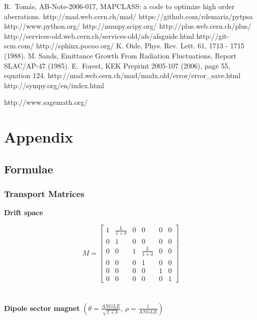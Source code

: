 \documentclass[a4paper]{cernatsnote}
\begin{document}
\begin{thebibliography}{9}   %

 R.~Tom\'as, AB-Note-2006-017, MAPCLASS: a code to
  optimize high order aberrations.
%
 http://mad.web.cern.ch/mad/
%
 https://github.com/rdemaria/pytpsa
%
 http://www.python.org/
%
 http://numpy.scipy.org/
%
 http://plus.web.cern.ch/plus/
%
  http://services-old.web.cern.ch/services-old/afs/afsguide.html
%
 http://git-scm.com/
%
 http://sphinx.pocoo.org/
%
 K. Oide, Phys. Rev. Lett. 61, 1713 - 1715 (1988).
%
 M. Sands, Emittance Growth From Radiation
  Fluctuations, Report SLAC/AP-47 (1985).
%
 E.~Forest, KEK Preprint 2005-107 (2006), page 55,
  equation 124.
%
 http://mad.web.cern.ch/mad/madx.old/error/error\_save.html
%
  http://sympy.org/en/index.html

  http://www.sagemath.org/

\end{thebibliography}

\clearpage
\appendix
\section{Appendix}

\subsection{Formulae}
\subsubsection{Transport Matrices}
\label{ap:trans1}
\textbf{Drift space}

\[
M
=
\begin{bmatrix}
1 & \frac{L}{1+\delta} & 0 & 0 & 0 & 0 \\[0.3em]
0 & 1 & 0 & 0 & 0 & 0 \\[0.3em]
0 & 0 & 1 & \frac{L}{1+\delta} & 0 & 0 \\[0.3em]
0 & 0 & 0 & 1 & 0 & 0 \\[0.3em]
0 & 0 & 0 & 0 & 1 & 0 \\[0.3em]
0 & 0 & 0 & 0 & 0 & 1
\end{bmatrix}
\]
\\\\
\textbf{Dipole sector magnet} $(\theta = \frac{ANGLE}{\sqrt{1+\delta}},\:
\rho = \frac{l}{ANGLE})$
\end{document}
